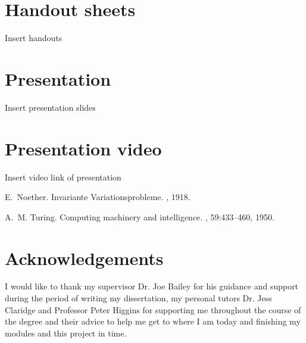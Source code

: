 \documentclass[12pt, a4paper,oneside]{book}
\numberwithin{equation}{section}
\begin{document}
\section*{Handout sheets}\label{secx}
Insert handouts

\section*{Presentation}\label{secx.x}
Insert presentation slides

\section*{Presentation video}\label{secx.x}
Insert video link of presentation


\begin{thebibliography}{999}

E.~Noether.
\newblock Invariante {V}ariationsprobleme.
, 1918.

A.~M. Turing.
\newblock Computing machinery and intelligence.
, 59:433--460, 1950.


\end{thebibliography}

\section*{Acknowledgements}
I would like to thank my supervisor Dr. Joe Bailey for his guidance and support during the period of writing my dissertation, my personal tutors Dr. Jess Claridge and Professor Peter Higgins for supporting me throughout the course of the degree and their advice to help me get to where I am today and finishing my modules and this project in time.
\end{document}
